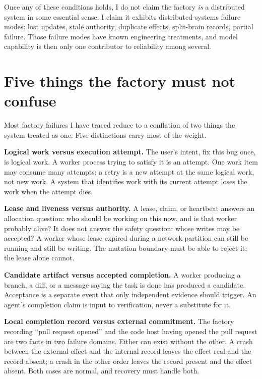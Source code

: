 Once any of these conditions holds, I do not claim the factory \emph{is} a distributed system in some essential sense. I claim it exhibits distributed-systems failure modes: lost updates, stale authority, duplicate effects, split-brain records, partial failure. Those failure modes have known engineering treatments, and model capability is then only one contributor to reliability among several.

\hypertarget{five-things-the-factory-must-not-confuse}{%
\section*{Five things the factory must not confuse}\label{five-things-the-factory-must-not-confuse}}

Most factory failures I have traced reduce to a conflation of two things the system treated as one. Five distinctions carry most of the weight.

\textbf{Logical work versus execution attempt.} The user's intent, fix this bug once, is logical work. A worker process trying to satisfy it is an attempt. One work item may consume many attempts; a retry is a new attempt at the same logical work, not new work. A system that identifies work with its current attempt loses the work when the attempt dies.

\textbf{Lease and liveness versus authority.} A lease, claim, or heartbeat answers an allocation question: who should be working on this now, and is that worker probably alive? It does not answer the safety question: whose writes may be accepted? A worker whose lease expired during a network partition can still be running and still be writing. The mutation boundary must be able to reject it; the lease alone cannot.

\textbf{Candidate artifact versus accepted completion.} A worker producing a branch, a diff, or a message saying the task is done has produced a candidate. Acceptance is a separate event that only independent evidence should trigger. An agent's completion claim is input to verification, never a substitute for it.

\textbf{Local completion record versus external commitment.} The factory recording ``pull request opened'' and the code host having opened the pull request are two facts in two failure domains. Either can exist without the other. A crash between the external effect and the internal record leaves the effect real and the record absent; a crash in the other order leaves the record present and the effect absent. Both cases are normal, and recovery must handle both.

